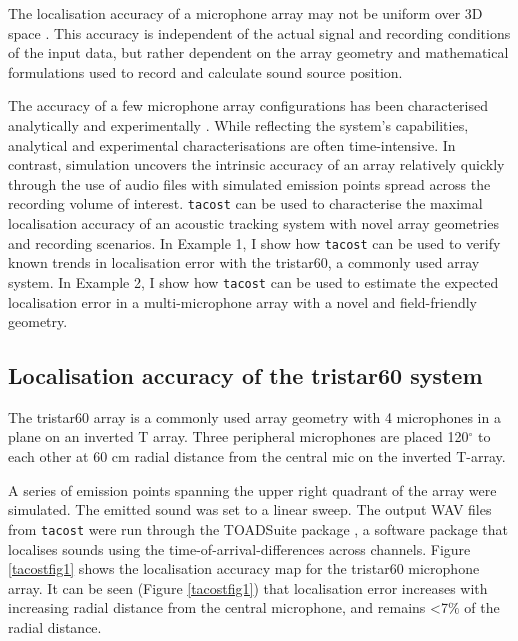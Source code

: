\documentclass[
]{book}
\begin{document}
The localisation accuracy of a microphone array may not be uniform over 3D space \citep{aubauer1994dreidimensionale, Wahlberg1999}. This accuracy is independent of the actual signal and recording conditions of the input data, but rather dependent on the array geometry and mathematical formulations used to record and calculate sound source position.

The accuracy of a few microphone array configurations has been characterised analytically \citep{aubauer1994dreidimensionale} and experimentally \citep{Wahlberg1999}. While reflecting the system's capabilities, analytical
and experimental characterisations are often time-intensive. In contrast, simulation uncovers the intrinsic accuracy of an array relatively quickly through the use of audio files with simulated emission points spread across the recording volume of interest.
\texttt{tacost} can be used to characterise the maximal localisation accuracy of an acoustic tracking system with novel array geometries and recording scenarios. In Example 1, I show how \texttt{tacost} can be used to verify known trends in
localisation error with the tristar60, a commonly used array system. In Example 2, I show how \texttt{tacost} can be used to estimate the expected localisation error in a multi-microphone array with a novel and field-friendly geometry.

\hypertarget{localisation-accuracy-of-the-tristar60-system}{%
\subsection{Localisation accuracy of the tristar60 system}\label{localisation-accuracy-of-the-tristar60-system}}

The tristar60 array is a commonly used array geometry \citep{aubauer1994dreidimensionale, Holderied20032293, Hugel2017, Lewanzik2018} with 4 microphones in a plane on an inverted T array. Three peripheral microphones are placed 120\(^{\circ}\) to each other at 60 cm radial distance from the central mic on the inverted T-array.

A series of emission points spanning the upper right quadrant of the array were simulated. The emitted sound was set to a linear sweep. The output WAV files from \texttt{tacost} were run through the TOADSuite package \citep{holger_toadsuite_manual, toadsuite_peterstilz}, a software package that localises sounds using the time-of-arrival-differences across channels. Figure \ref{tacostfig1} shows the localisation accuracy map
for the tristar60 microphone array. It can be seen (Figure \ref{tacostfig1}) that localisation error increases with increasing radial distance from the central microphone, and remains \textless7\(\%\) of the radial distance.
\end{document}
